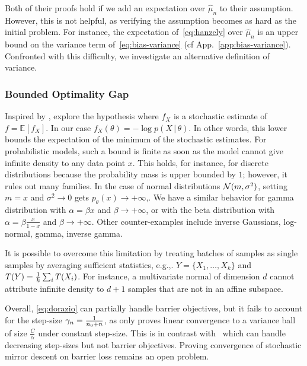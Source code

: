 \documentclass[twoside]{article}
\newcommand*{\expect}[2][]{\ensuremath{\mathbb{E}_{#1} \left[ #2 \right] }} %
\newcommand*{\expecti}[2][]{\ensuremath{\mathbb{E}_{#1} [ #2 ] }} %
\newcommand{\cond}{\,\vert\,}
\newcommand{\nat}{\theta}
\newcommand{\m}{\mu}
\newcommand{\lr}{\gamma} %
\newcommand{\MAPm}{\hat \m_n}
\newcommand{\stgcvx}{\alpha} %
\begin{document}
Both of their proofs hold if we add an expectation over $\MAPm$ to their assumption.
However, this is not helpful, as verifying the assumption becomes as hard as the initial problem.
For instance, the expectation of~\eqref{eq:hanzely} over $\MAPm$ is an upper bound on the variance term of~\eqref{eq:bias-variance} (cf App.~\ref{app:bias-variance}).
Confronted with this difficulty, we investigate an alternative definition of variance.

\subsubsection{Bounded Optimality Gap}
Inspired by \citet{loizou2021stochastic}, \citet{dorazio2021stochastic} explore the hypothesis
\alignn{
	\min_\nat f(\nat) - \expect[X]{\min_\nat f_X(\nat)} \leq C \; ,
	\label{eq:dorazio}
}
where $f_X$ is a stochastic estimate of $f = \expecti{f_X}$. In our case $f_X(\nat) = - \log p(X\cond \nat)$.
In other words, this lower bounds the expectation of the minimum of the stochastic estimates.
For probabilistic models, such a bound is finite as soon as the model cannot give infinite density to any data point $x$.
This holds, for instance, for discrete distributions because the probability mass is upper bounded by $1$; however, it rules out many families.
In the case of normal distributions ${\mathcal N}(m, \sigma^2)$, setting $m=x$ and $\sigma^2 \rightarrow 0$ gets $p_\nat (x) \rightarrow +\infty$,.
We have a similar behavior for gamma distribution with $\alpha = \beta x$ and $\beta \rightarrow +\infty$, or with the beta distribution with $\alpha=\beta \frac{x}{1-x}$ and $\beta \rightarrow +\infty$.
Other counter-examples include inverse Gaussians, log-normal, gamma, inverse gamma.

It is possible to overcome this limitation by treating batches of samples as single samples by averaging sufficient statistics, e.g.,. $Y = \{X_1, \dots, X_k\}$ and $T(Y) = \frac{1}{k}\sum_i T(X_i)$.
For instance, a multivariate normal of dimension $d$ cannot attribute infinite density to $d+1$ samples that are not in an affine subspace.

Overall, \eqref{eq:dorazio} can partially handle barrier objectives, but it fails to account for the step-size $\lr_n = \inv{n_0+n}$, as \citet[Thm.1]{dorazio2021stochastic} only proves linear convergence to a variance ball of size $\frac{C}{\stgcvx}$ under constant step-size.
This is in contrast with~\citet{dragomir2021fast} which can handle decreasing step-sizes but not barrier objectives.
Proving convergence of stochastic mirror descent on barrier loss remains an open problem.
\end{document}
